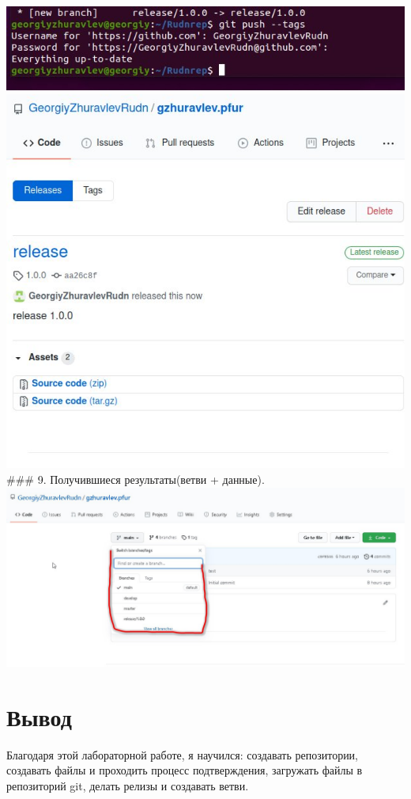 \includegraphics{scrsht/9.jpg} \includegraphics{scrsht/10.jpg} \#\#\# 9.
Получившиеся результаты(ветви + данные). \includegraphics{scrsht/11.jpg}

\hypertarget{ux432ux44bux432ux43eux434}{%
\section{Вывод}\label{ux432ux44bux432ux43eux434}}

Благодаря этой лабораторной работе, я научился: создавать репозитории,
создавать файлы и проходить процесс подтверждения, загружать файлы в
репозиторий git, делать релизы и создавать ветви.

